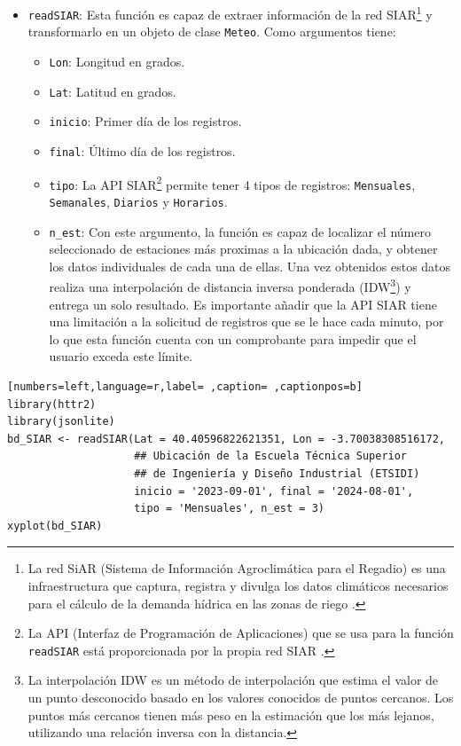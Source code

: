 \begin{itemize}
\item \texttt{readSIAR}: Esta función es capaz de extraer información de la red SIAR\footnote{La red SiAR (Sistema de Información Agroclimática para el Regadio) es una infraestructura que captura, registra y divulga los datos climáticos necesarios para el cálculo de la demanda hídrica en las zonas de riego \cite{siar23}.} y transformarlo en un objeto de clase \texttt{Meteo}.
Como argumentos tiene:
\begin{itemize}
\item \texttt{Lon}: Longitud en grados.
\item \texttt{Lat}: Latitud en grados.
\item \texttt{inicio}: Primer día de los registros.
\item \texttt{final}: Último día de los registros.
\item \texttt{tipo}: La API SIAR\footnote{La API (Interfaz de Programación de Aplicaciones) que se usa para la función \texttt{readSIAR} está proporcionada por la propia red SIAR \cite{siar23}.} permite tener 4 tipos de registros: \texttt{Mensuales}, \texttt{Semanales}, \texttt{Diarios} y \texttt{Horarios}.
\item \texttt{n\_est}: Con este argumento, la función es capaz de localizar el número seleccionado de estaciones más proximas a la ubicación dada, y obtener los datos individuales de cada una de ellas. Una vez obtenidos estos datos realiza una interpolación de distancia inversa ponderada (IDW\footnote{La interpolación IDW es un método de interpolación que estima el valor de un punto desconocido basado en los valores conocidos de puntos cercanos. Los puntos más cercanos tienen más peso en la estimación que los más lejanos, utilizando una relación inversa con la distancia.}) y entrega un solo resultado. Es importante añadir que la API SIAR tiene una limitación a la solicitud de registros que se le hace cada minuto, por lo que esta función cuenta con un comprobante para impedir que el usuario exceda este límite.
\end{itemize}
\end{itemize}
\begin{lstlisting}[numbers=left,language=r,label= ,caption= ,captionpos=b]
library(httr2)
library(jsonlite)
bd_SIAR <- readSIAR(Lat = 40.40596822621351, Lon = -3.70038308516172,
                    ## Ubicación de la Escuela Técnica Superior
                    ## de Ingeniería y Diseño Industrial (ETSIDI)
                    inicio = '2023-09-01', final = '2024-08-01',
                    tipo = 'Mensuales', n_est = 3)
xyplot(bd_SIAR)
\end{lstlisting}

